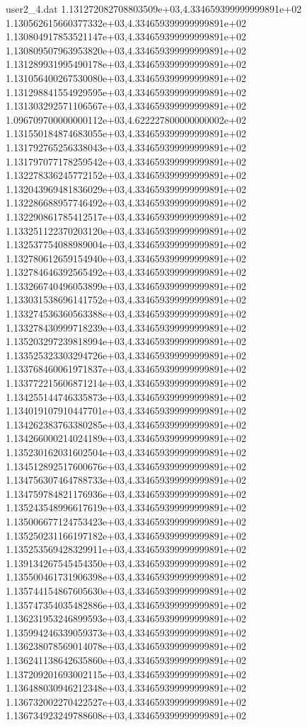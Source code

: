 \begin{filecontents}{user2_4.dat}
1.131272082708803509e+03,4.334659399999999891e+02
1.130562615660377332e+03,4.334659399999999891e+02
1.130804917853521147e+03,4.334659399999999891e+02
1.130809507963953820e+03,4.334659399999999891e+02
1.131289931995490178e+03,4.334659399999999891e+02
1.131056400267530080e+03,4.334659399999999891e+02
1.131298841554929595e+03,4.334659399999999891e+02
1.131303292571106567e+03,4.334659399999999891e+02
1.096709700000000112e+03,4.622227800000000002e+02
1.131550184874683055e+03,4.334659399999999891e+02
1.131792765256338043e+03,4.334659399999999891e+02
1.131797077178259542e+03,4.334659399999999891e+02
1.132278336245772152e+03,4.334659399999999891e+02
1.132043969481836029e+03,4.334659399999999891e+02
1.132286688957746492e+03,4.334659399999999891e+02
1.132290861785412517e+03,4.334659399999999891e+02
1.133251122370203120e+03,4.334659399999999891e+02
1.132537754088989004e+03,4.334659399999999891e+02
1.132780612659154940e+03,4.334659399999999891e+02
1.132784646392565492e+03,4.334659399999999891e+02
1.133266740496053899e+03,4.334659399999999891e+02
1.133031538696141752e+03,4.334659399999999891e+02
1.133274536360563388e+03,4.334659399999999891e+02
1.133278430999718239e+03,4.334659399999999891e+02
1.135203297239818994e+03,4.334659399999999891e+02
1.133525323303294726e+03,4.334659399999999891e+02
1.133768460061971837e+03,4.334659399999999891e+02
1.133772215606871214e+03,4.334659399999999891e+02
1.134255144746335873e+03,4.334659399999999891e+02
1.134019107910447701e+03,4.334659399999999891e+02
1.134262383763380285e+03,4.334659399999999891e+02
1.134266000214024189e+03,4.334659399999999891e+02
1.135230162031602504e+03,4.334659399999999891e+02
1.134512892517600676e+03,4.334659399999999891e+02
1.134756307464788733e+03,4.334659399999999891e+02
1.134759784821176936e+03,4.334659399999999891e+02
1.135243548996617619e+03,4.334659399999999891e+02
1.135006677124753423e+03,4.334659399999999891e+02
1.135250231166197182e+03,4.334659399999999891e+02
1.135253569428329911e+03,4.334659399999999891e+02
1.139134267545454350e+03,4.334659399999999891e+02
1.135500461731906398e+03,4.334659399999999891e+02
1.135744154867605630e+03,4.334659399999999891e+02
1.135747354035482886e+03,4.334659399999999891e+02
1.136231953246899593e+03,4.334659399999999891e+02
1.135994246339059373e+03,4.334659399999999891e+02
1.136238078569014078e+03,4.334659399999999891e+02
1.136241138642635860e+03,4.334659399999999891e+02
1.137209201693002115e+03,4.334659399999999891e+02
1.136488030946212348e+03,4.334659399999999891e+02
1.136732002270422527e+03,4.334659399999999891e+02
1.136734923249788608e+03,4.334659399999999891e+02

\end{filecontents}
